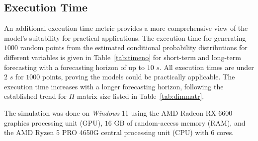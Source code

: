 \documentclass[preprint,12pt]{elsarticle}
\begin{document}
\subsection{Execution Time}

An additional execution time metric provides a more comprehensive view of the model's suitability for practical applications. The execution time for generating $1000$ random points from the estimated conditional probability distributions for different variables is given in Table~\ref{tab:timeno} for short-term and long-term forecasting with a forecasting horizon of up to $10$ $s$. All execution times are under $2$ $s$ for $1000$ points, proving the models could be practically applicable. The execution time increases with a longer forecasting horizon, following the established trend for $\Pi$ matrix size listed in Table~\ref{tab:dimmatr}.

The simulation was done on \textit{Windows} 11 using the AMD Radeon RX 6600 graphics processing unit (GPU), $16$ GB of random-access memory (RAM), and the AMD Ryzen 5 PRO 4650G central processing unit (CPU) with $6$ cores.
\end{document}
